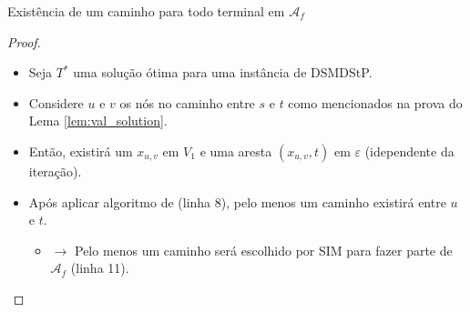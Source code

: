 \documentclass[10pt]{beamer}
\begin{document}
\begin{frame}{Existência de um caminho para todo terminal em $\mathcal{A}_f$ \hyperlink{terminals_covered}{}}
\hypertarget{terminals_covered_slide}{}
  \begin{proof}%
    \begin{itemize}
      \item <2-> Seja $T^*$ uma solução ótima para uma instância de DSMDStP.
      \item <3-> Considere $u$ e $v$ os nós no caminho entre $s$ e $t$ como mencionados na prova do Lema \ref{lem:val_solution}.
      \item <4-> Então, existirá um $x_{u,v}$ em $V_1$ e uma aresta $(x_{u,v},t)$ em $\varepsilon$ (idependente da iteração).
      \item <5-> Após aplicar algoritmo de \cite{Chekuri2004} (linha 8), pelo menos um caminho existirá entre $u$ e $t$.
      \begin{itemize}
	\item <6-> $\rightarrow$ Pelo menos um caminho será escolhido por SIM para fazer parte de $\mathcal{A}_f$ (linha 11).
      \end{itemize}
    \end{itemize}
  \end{proof}
\end{frame}
\end{document}
